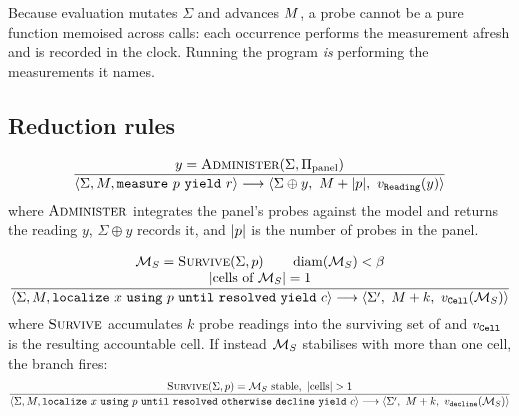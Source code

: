 \begin{corollary}
\label{cfc:cor:measure}
Because evaluation mutates $\Sigma$ and advances $M$, a  probe cannot
be a pure function memoised across calls: each occurrence performs the
measurement afresh and is recorded in the clock. Running the program \emph{is}
performing the measurements it names.
\end{corollary}

\subsection{Reduction rules}

\begin{rulename}
\label{cfc:rule:measure-step}
\[
\frac{y=\textsc{Administer}(\Sigma,\Probe_{\mathrm{panel}})}
     {\langle\Sigma,\rec,\cfckw{measure}\ p\ \cfckw{yield}\ r\rangle\stepto
      \langle\Sigma\oplus y,\ \rec+\abs{p},\ v_{\cfckw{Reading}}(y)\rangle}
\]
where $\textsc{Administer}$ integrates the panel's probes against the model and
returns the reading $y$, $\Sigma\oplus y$ records it, and $\abs{p}$ is the
number of probes in the panel.
\end{rulename}

\begin{rulename}
\label{cfc:rule:localize-step}
\[
\frac{\begin{array}{c}
\Man_S=\textsc{Survive}(\Sigma,p)\qquad\diam(\Man_S)<\flo\\
\abs{\text{cells of }\Man_S}=1
\end{array}}
{\langle\Sigma,\rec,\cfckw{localize}\ x\ \cfckw{using}\ p\ \cfckw{until}\ \cfckw{resolved}\ \cfckw{yield}\ c\rangle\stepto
 \langle\Sigma',\ \rec+k,\ v_{\cfckw{Cell}}(\Man_S)\rangle}
\]
where $\textsc{Survive}$ accumulates $k$ probe readings into the surviving set
of  and $v_{\texttt{Cell}}$ is the resulting accountable cell.
If instead $\mathcal{M}_S$ stabilises with more than one cell, the
 branch fires:
\[
\frac{\textsc{Survive}(\Sigma,p)=\Man_S\text{ stable},\ \abs{\text{cells}}>1}
{\langle\Sigma,\rec,\cfckw{localize}\ x\ \cfckw{using}\ p\ \cfckw{until}\ \cfckw{resolved}\ \cfckw{otherwise}\ \cfckw{decline}\ \cfckw{yield}\ c\rangle\stepto
 \langle\Sigma',\ \rec+k,\ v_{\cfckw{decline}}(\Man_S)\rangle}
\]
\end{rulename}

